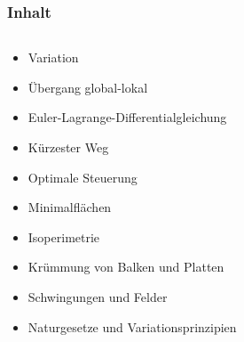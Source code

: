 %
%
%
\bgroup
\begin{frame}[t]
\setlength{\abovedisplayskip}{5pt}
\setlength{\belowdisplayskip}{5pt}
\frametitle{Inhalt}
\vspace{-20pt}
\begin{columns}[t,onlytextwidth]
\begin{column}{0.48\textwidth}
\begin{itemize}
\item<2-> Variation
\item<3-> Übergang global-lokal
\item<4-> Euler-Lagrange-Differentialgleichung
\item<5-> Kürzester Weg
\item<6-> Optimale Steuerung
\item<7-> Minimalflächen
\item<8-> Isoperimetrie
\item<9-> Krümmung von Balken und Platten
\item<10-> Schwingungen und Felder
\item<11-> Naturgesetze und Variationsprinzipien
\end{itemize}
\end{column}
\begin{column}{0.48\textwidth}
\end{column}
\end{columns}
\end{frame}
\egroup
